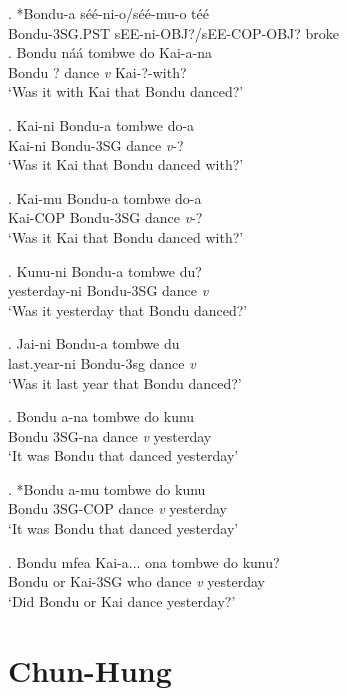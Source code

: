 \documentclass{assets/fieldnotes}
\begin{document}
\exg. *Bondu-a séé-ni-o/séé-mu-o téé\\
Bondu-3SG.PST sEE-ni-OBJ?/sEE-COP-OBJ? broke\\

\exg. Bondu náá tombwe do Kai-a-na\\
Bondu ? dance \textit{v} Kai-?-with?\\
`Was it with Kai that Bondu danced?'

\exg. Kai-ni Bondu-a tombwe do-a\\
Kai-ni Bondu-3SG dance \textit{v}-?\\
`Was it Kai that Bondu danced with?'

\exg. Kai-mu Bondu-a tombwe do-a\\
Kai-COP Bondu-3SG dance \textit{v}-?\\
`Was it Kai that Bondu danced with?'

\exg. Kunu-ni Bondu-a tombwe du?\\
yesterday-ni Bondu-3SG dance \textit{v}\\
`Was it yesterday that Bondu danced?'

\exg. Jai-ni Bondu-a tombwe du\\
last.year-ni Bondu-3sg dance \textit{v}\\
`Was it last year that Bondu danced?'

\exg. Bondu a-na tombwe do kunu\\
Bondu 3SG-na dance \textit{v} yesterday\\
`It was Bondu that danced yesterday'

\exg. *Bondu a-mu tombwe do kunu\\
Bondu 3SG-COP dance \textit{v} yesterday\\
`It was Bondu that danced yesterday'

\exg. Bondu mfea Kai-a... \textipa{\textltailn}ona tombwe do kunu?\\
Bondu or Kai-3SG who dance \textit{v} yesterday\\
`Did Bondu or Kai dance yesterday?'\\



\section{Chun-Hung}

 \newline
\end{document}
